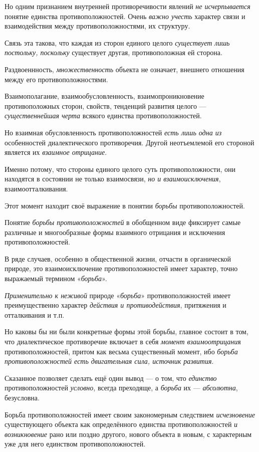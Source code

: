 \documentclass[a4paper,14pt,russian]{extreport}
\begin{document}
Но одним признанием внутренней противоречивости явлений \emph{не исчерпывается} понятие единства противоположностей. Очень \emph{важно учесть} характер связи и взаимодействия между противоположностями, их структуру.

Связь эта такова, что каждая из сторон единого целого \emph{существует лишь} \emph{постольку, поскольку} существует другая, противоположная ей сторона.

Раздвоеннность, \emph{множественность} объекта не означает, внешнего отношения между его противоположностями.

Взаимополагание, взаимообусловленность, взаимопроникновение противоположных сторон, свойств, тенденций развития целого --- \emph{существеннейшая черта} всякого единства противоположностей.

Но взаимная обусловленность противоположностей \emph{есть лишь одна из} особенностей диалектического противоречия. Другой неотъемлемой его стороной является их \emph{взаимное отрицание}.

Именно потому, что стороны единого целого суть противоположности, они находятся в состоянии не только взаимосвязи, \emph{но и взаимоисключения}, взаимоотталкивания.

Этот момент находит своё выражение в понятии \emph{борьбы} противоположностей.

Понятие \emph{борьбы противоположностей} в обобщенном виде фиксирует самые различные и многообразные формы взаимного отрицания и исключения противоположностей.

В ряде случаев, особенно в общественной жизни, отчасти в органической природе, это взаимоисключение противоположностей имеет характер, точно выражаемый термином «\emph{борьба}».

\emph{Применительно к неживой} природе «\emph{борьба}» противоположностей имеет преимущественно характер \emph{действия и противодействия}, притяжения и отталкивания и т.п.

Но каковы бы ни были конкретные формы этой борьбы, главное состоит в том, что диалектическое противоречие включает в себя \emph{момент взаимоотрицани}я противоположностей, притом как весьма существенный момент, ибо \emph{борьба противоположностей есть двигательная сила, источник развития}.

Сказанное позволяет сделать ещё один вывод --- о том, что \emph{единство} противоположностей \emph{условно}, всегда преходяще, а \emph{борьба} их --- \emph{абсолютна}, безусловна.

Борьба противоположностей имеет своим закономерным следствием \emph{исчезновение} существующего объекта как определённого единства противоположностей \emph{и возникновение} рано или поздно другого, нового объекта в новым, с характерным уже для него единством противоположностей.
\end{document}
